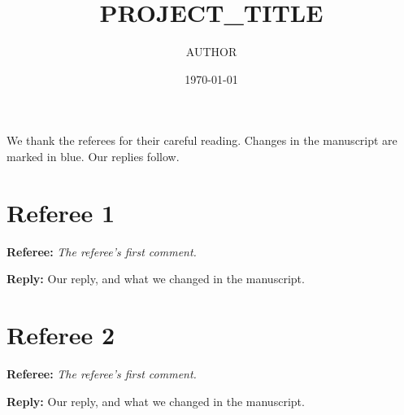\documentclass[11pt]{article}
\title{{{PROJECT_TITLE}}}
\author{{{AUTHOR}}}
\date{\today}
\newenvironment{comment}{\par\medskip\noindent\textbf{Referee:}\itshape}{\par}
\newenvironment{reply}{\par\smallskip\noindent\textbf{Reply:}\color{blue!50!black}}{\par}
\begin{document}
\maketitle

We thank the referees for their careful reading. Changes in the manuscript are
marked in blue. Our replies follow.

\section*{Referee 1}

\begin{comment}
The referee's first comment.
\end{comment}
\begin{reply}
Our reply, and what we changed in the manuscript.
\end{reply}

\section*{Referee 2}

\begin{comment}
The referee's first comment.
\end{comment}
\begin{reply}
Our reply, and what we changed in the manuscript.
\end{reply}
\end{document}
